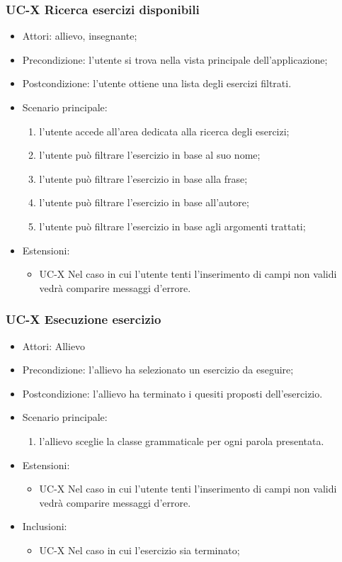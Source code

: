 	\subsubsection{UC-X Ricerca esercizi disponibili}
		\begin{itemize}
			\item Attori: allievo, insegnante;
			\item Precondizione: l'utente si trova nella vista principale dell'applicazione;
			\item Postcondizione: l'utente ottiene una lista degli esercizi filtrati.
			\item Scenario principale:
				\begin{enumerate}
					\item l'utente accede all'area dedicata alla ricerca degli esercizi;
					\item l'utente può filtrare l'esercizio in base al suo nome;
					\item l'utente può filtrare l'esercizio in base alla frase;
					\item l'utente può filtrare l'esercizio in base all'autore;
					\item l'utente può filtrare l'esercizio in base agli argomenti trattati;
				\end{enumerate}
			\item Estensioni:
				\begin{itemize}
					\item UC-X Nel caso in cui l'utente tenti l'inserimento di campi non validi vedrà comparire messaggi d'errore.
				\end{itemize}
		\end{itemize}

	\subsubsection{UC-X Esecuzione esercizio}
		\begin{itemize}
			\item Attori: Allievo
			\item Precondizione: l'allievo ha selezionato un esercizio da eseguire;
			\item Postcondizione: l'allievo ha terminato i quesiti proposti dell'esercizio.
			\item Scenario principale:
				\begin{enumerate}
					\item l'allievo sceglie la classe grammaticale per ogni parola presentata.
				\end{enumerate}
			\item Estensioni: 
				\begin{itemize}
					\item UC-X Nel caso in cui l'utente tenti l'inserimento di campi non validi vedrà comparire messaggi d'errore.
				\end{itemize}
			\item Inclusioni:
				\begin{itemize}
					\item UC-X Nel caso in cui l'esercizio sia terminato;
				\end{itemize}
			\end{itemize}

